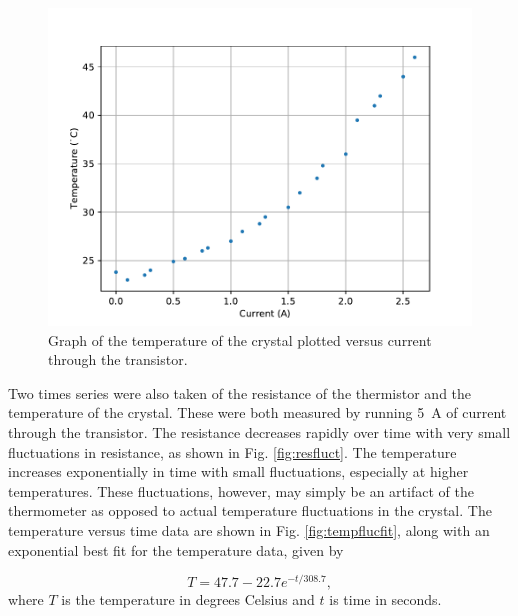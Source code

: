 \begin{figure}[h!]
  \centering
  \includegraphics[width = .8\textwidth]{Images/TvsI.pdf}
  \caption{Graph of the temperature of the crystal plotted versus current through the transistor.}
  \label{fig:tvsi}
\end{figure}


Two times series were also taken of the resistance of the thermistor and the temperature of the crystal. These were both measured by running \SI{5}{ A} of current through the transistor. The resistance decreases rapidly over time with very small fluctuations in resistance, as shown in Fig. \ref{fig:resfluct}. The temperature increases exponentially in time with small fluctuations, especially at higher temperatures. These fluctuations, however, may simply be an artifact of the thermometer as opposed to actual temperature fluctuations in the crystal. The temperature versus time data are shown in Fig. \ref{fig:tempflucfit}, along with an exponential best fit for the temperature data, given by

\begin{equation}
	T = 47.7 - 22.7 e^{-t/308.7},
	\label{eq:temptime}
\end{equation}
%
where $T$ is the temperature in degrees Celsius and $t$ is time in seconds.


